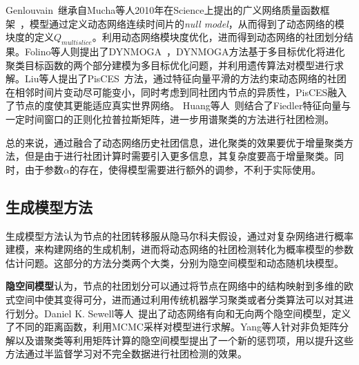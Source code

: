  Genlouvain~\cite{jutla2011generalized}继承自Mucha等人2010年在Science上提出的广义网络质量函数框架~\cite{mucha2010community}，模型通过定义动态网络连续时间片的\textit{null model}，从而得到了动态网络的模块度的定义$Q_{multislice}$。利用动态网络模块度优化，进而得到动态网络的社团划分结果。Folino等人则提出了DYNMOGA~\cite{folino2014evolutionary}，DYNMOGA方法基于多目标优化将进化聚类目标函数的两个部分建模为多目标优化问题，并利用遗传算法对模型进行求解。Liu等人提出了PisCES~\cite{liu2018global}方法，通过特征向量平滑的方法约束动态网络的社团在相邻时间片变动尽可能变小，同时考虑到同社团内节点的异质性，PisCES融入了节点的度使其更能适应真实世界网络。 Huang等人~\cite{huang2019community}则结合了Fiedler特征向量与一定时间窗口的正则化拉普拉斯矩阵，进一步用谱聚类的方法进行社团检测。
 
 总的来说，通过融合了动态网络历史社团信息，进化聚类的效果要优于增量聚类方法，但是由于进行社团计算时需要引入更多信息，其复杂度要高于增量聚类。同时，由于参数$\alpha$的存在，使得模型需要进行额外的调参，不利于实际使用。

\subsection{生成模型方法}

生成模型方法认为节点的社团转移服从隐马尔科夫假设，通过对复杂网络进行概率建模，来构建网络的生成机制，进而将动态网络的社团检测转化为概率模型的参数估计问题。这部分的方法分类两个大类，分别为隐空间模型和动态随机块模型。

\textbf{隐空间模型}认为，节点的社团划分可以通过将节点在网络中的结构映射到多维的欧式空间中使其变得可分，进而通过利用传统机器学习聚类或者分类算法可以对其进行划分。Daniel K. Sewell等人~\cite{sewell2017latent}提出了动态网络有向和无向两个隐空间模型，定义了不同的距离函数，利用MCMC采样对模型进行求解。Yang等人\cite{yang2015a}针对非负矩阵分解以及谱聚类等利用矩阵计算的隐空间模型提出了一个新的惩罚项，用以提升这些方法通过半监督学习对不完全数据进行社团检测的效果。

